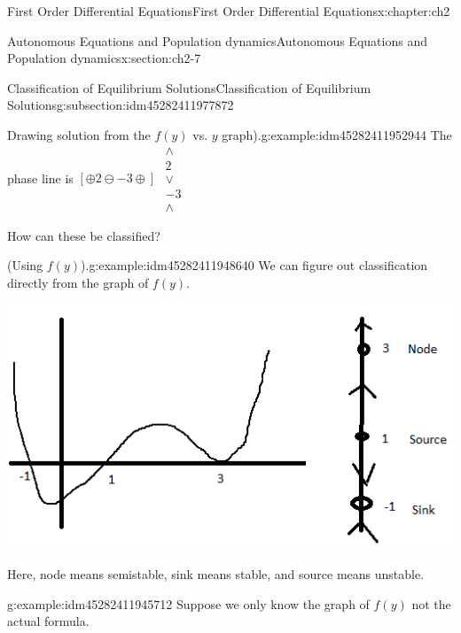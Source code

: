 \documentclass[oneside,10pt,]{book}
\numberwithin{equation}{section}
\numberwithin{equation}{section}
\begin{document}
\begin{chapterptx}{First Order Differential Equations}{}{First Order Differential Equations}{}{}{x:chapter:ch2}
\begin{sectionptx}{Autonomous Equations and Population dynamics}{}{Autonomous Equations and Population dynamics}{}{}{x:section:ch2-7}
\begin{subsectionptx}{Classification of Equilibrium Solutions}{}{Classification of Equilibrium Solutions}{}{}{g:subsection:idm45282411977872}
\begin{example}{Drawing solution from the \(f(y)\) vs. \(y\) graph).}{g:example:idm45282411952944}
The phase line is \(\left[\oplus2\ominus-3\oplus\right]\) \(\begin{array}{c}
\wedge\\
2\\
\vee\\
-3\\
\wedge
\end{array}\)%
\par
How can these be classified?%
\end{example}
\begin{example}{(Using \(f(y)\)).}{g:example:idm45282411948640}%
We can figure out classification directly from the graph of \(f(y)\). \begin{image}{0}{1}{0}%
\includegraphics[width=\linewidth]{images/1.6-Classif-1.png}
\end{image}%
 Here, node means semistable, sink means stable, and source means unstable.%
\end{example}
\begin{example}{}{g:example:idm45282411945712}%
Suppose we only know the graph of \(f(y)\) not the actual formula. \begin{image}{0}{1}{0}%

\end{image}
\end{example}
\end{subsectionptx}
\end{sectionptx}
\end{chapterptx}
\end{document}
